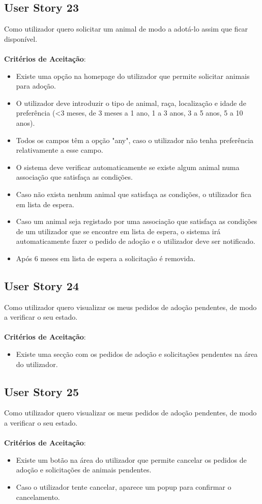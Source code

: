 \documentclass[a4paper,11pt]{article}
\begin{document}
\subsection*{User Story 23}
Como utilizador quero solicitar um animal de modo a adotá-lo assim que ficar disponível.\\\\
\textbf{Critérios de Aceitação}:
\begin{itemize}
  \item Existe uma opção na homepage do utilizador que permite solicitar animais para adoção.
  \item O utilizador deve introduzir o tipo de animal, raça, localização e idade de preferência (<3 meses, de 3 meses a 1 ano, 1 a 3 anos, 3 a 5 anos, 5 a 10 anos).
  \item Todos os campos têm a opção "any", caso o utilizador não tenha preferência relativamente a esse campo.
  \item O sistema deve verificar automaticamente se existe algum animal numa associação que satisfaça as condições.
  \item Caso não exista nenhum animal que satisfaça as condições, o utilizador fica em lista de espera.
  \item Caso um animal seja registado por uma associação que satisfaça as condições de um utilizador que se encontre em lista de espera, o sistema irá automaticamente fazer o pedido de adoção e o utilizador deve ser notificado.
  \item Após 6 meses em lista de espera a solicitação é removida.
\end{itemize}

\subsection*{User Story 24}
Como utilizador quero visualizar os meus pedidos de adoção pendentes, de modo a verificar o seu estado.\\\\
\textbf{Critérios de Aceitação}:
\begin{itemize}
  \item Existe uma secção com os pedidos de adoção e solicitações pendentes na área do utilizador.
\end{itemize}

\subsection*{User Story 25}
Como utilizador quero visualizar os meus pedidos de adoção pendentes, de modo a verificar o seu estado.\\\\
\textbf{Critérios de Aceitação}:
\begin{itemize}
  \item Existe um botão na área do utilizador que permite cancelar os pedidos de adoção e solicitações de animais pendentes.
  \item Caso o utilizador tente cancelar, aparece um popup para confirmar o cancelamento.
\end{itemize}
\end{document}

